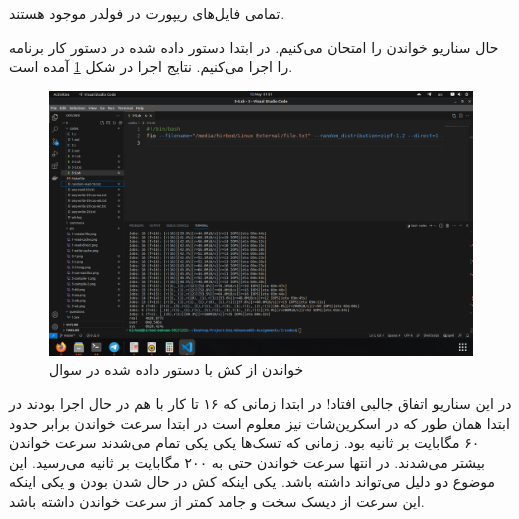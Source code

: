 تمامی فایل‌های ریپورت
در فولدر
موجود هستند.

حال سناریو خواندن را امتحان می‌کنیم. در ابتدا دستور داده شده در دستور کار برنامه را اجرا می‌کنیم.
نتایج اجرا در شکل
\ref{fig:3-rand-read-16}
آمده است.
\begin{figure}[H]
    \centering
    \includegraphics[scale=0.25]{pic/3-rand-read-16.png}
    \caption{خواندن از کش با دستور داده شده در سوال}
    \label{fig:3-rand-read-16}
\end{figure}
در این سناریو اتفاق جالبی افتاد! در ابتدا زمانی که ۱۶ تا کار با هم در حال اجرا بودند در ابتدا همان طور که در اسکرین‌شات
نیز معلوم است در ابتدا سرعت خواندن برابر حدود ۶۰ مگابایت بر ثانیه بود. زمانی که تسک‌ها یکی یکی تمام می‌شدند سرعت
خواندن بیشتر می‌شدند. در انتها سرعت خواندن حتی به ۲۰۰ مگابایت بر ثانیه می‌رسید. این موضوع دو دلیل می‌تواند داشته
باشد. یکی اینکه کش در حال
شدن بودن و یکی اینکه این سرعت
از دیسک سخت و جامد کمتر از سرعت خواندن
داشته باشد.

